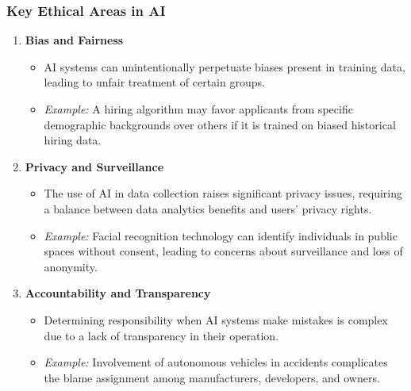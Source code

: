 \documentclass[aspectratio=169]{beamer}
\begin{document}
\begin{frame}[fragile]
    \frametitle{Key Ethical Areas in AI}
    \begin{enumerate}
        \item \textbf{Bias and Fairness}
          \begin{itemize}
              \item AI systems can unintentionally perpetuate biases present in training data, leading to unfair treatment of certain groups.
              \item \textit{Example:} A hiring algorithm may favor applicants from specific demographic backgrounds over others if it is trained on biased historical hiring data.
          \end{itemize}
          
        \item \textbf{Privacy and Surveillance}
          \begin{itemize}
              \item The use of AI in data collection raises significant privacy issues, requiring a balance between data analytics benefits and users' privacy rights.
              \item \textit{Example:} Facial recognition technology can identify individuals in public spaces without consent, leading to concerns about surveillance and loss of anonymity.
          \end{itemize}
          
        \item \textbf{Accountability and Transparency}
          \begin{itemize}
              \item Determining responsibility when AI systems make mistakes is complex due to a lack of transparency in their operation.
              \item \textit{Example:} Involvement of autonomous vehicles in accidents complicates the blame assignment among manufacturers, developers, and owners.
          \end{itemize}
    \end{enumerate}
\end{frame}
\end{document}
